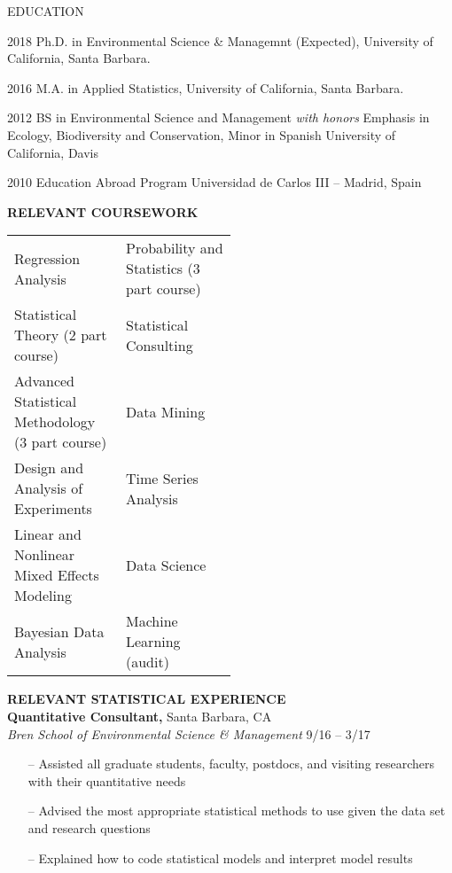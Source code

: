 \begin{vitae}

\begin{vitaesection}{\uppercase{Education}}
\vspace{-0.1cm}
\item [2018]	Ph.D. in Environmental Science \& Managemnt (Expected), University of California, Santa Barbara.
\item [2016]	M.A. in Applied Statistics, University of California, Santa Barbara.
\item [2012] 	BS in Environmental Science and Management \textit{with honors} Emphasis in Ecology, Biodiversity and Conservation, Minor in Spanish 
University of California, Davis 
\item  [2010] Education Abroad Program Universidad de Carlos III – Madrid, Spain
\end{vitaesection}

\textbf{\uppercase{Relevant Coursework}}
\begin{tabular}{l p{0.5\linewidth}}
Regression Analysis & Probability and Statistics (3 part course) \\
Statistical Theory (2 part course) & Statistical Consulting \\
Advanced Statistical Methodology (3 part course) & Data Mining \\
Design and Analysis of Experiments & Time Series Analysis \\
Linear and Nonlinear Mixed Effects Modeling & Data Science \\
Bayesian Data Analysis & Machine Learning (audit) \\
\end{tabular}

\textbf{\uppercase{Relevant Statistical Experience}} \\
\textbf{Quantitative Consultant,} Santa Barbara, CA \\
\textit{Bren School of Environmental Science \& Management}
\hfill
9/16 – 3/17
\vspace{-\topsep}
\begin{itemize}
\setlength{\parskip}{0pt}
 \setlength{\itemsep}{0pt plus 1pt}
\item[--] Assisted all graduate students, faculty, postdocs, and visiting researchers with their quantitative needs 
\item[--] Advised the most appropriate statistical methods to use given the data set and research questions 
\item[--] Explained how to code statistical models and interpret model results
\end{itemize}
\vspace{-\topsep}


\end{vitae}
